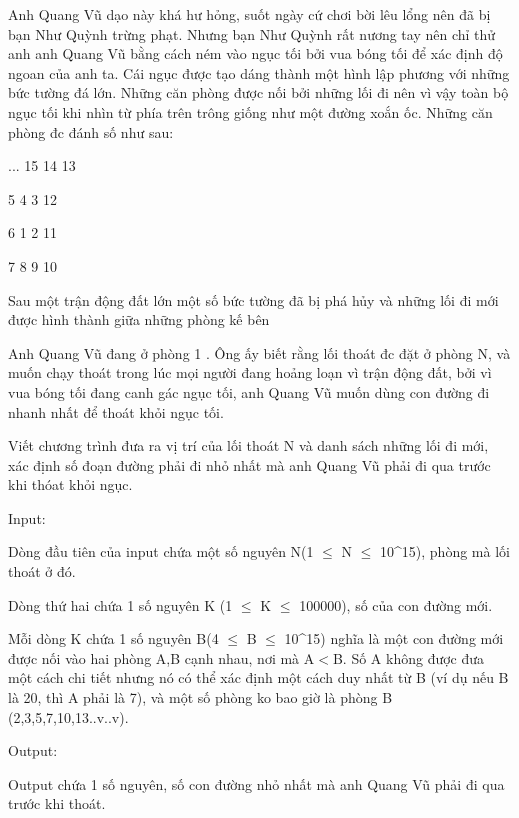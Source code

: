 



   Anh Quang Vũ dạo này khá hư hỏng, suốt ngày cứ chơi bời lêu lổng nên đã bị bạn Như Quỳnh trừng phạt. Nhưng bạn Như Quỳnh rất nương tay nên chỉ thử anh anh Quang Vũ bằng cách ném vào ngục tối bởi vua bóng tối để xác định độ ngoan của anh ta. Cái ngục được tạo dáng thành một hình lập phương với những bức tường đá lớn. Những căn phòng được nối bởi những lối đi nên vì vậy toàn bộ ngục tối khi nhìn từ phía trên trông giống như một đường xoắn ốc. Những căn phòng đc đánh số như sau:  



   ... 15  14  13  

   5   4    3  12  

   6   1    2  11  

   7   8    9  10  





   Sau một trận động đất lớn một số bức tường đã bị phá hủy và những lối đi mới được hình thành giữa những phòng kế bên  

   Anh Quang Vũ đang ở phòng 1 . Ông ấy biết rằng lối thoát đc đặt ở phòng N, và muốn chạy thoát trong lúc mọi người đang hoảng loạn vì trận động đất, bởi vì vua bóng tối đang canh gác ngục tối, anh Quang Vũ muốn dùng con đường đi nhanh nhất để thoát khỏi ngục tối.  

   Viết chương trình đưa ra vị trí của lối thoát N và danh sách những lối đi mới, xác định số đoạn đường phải đi nhỏ nhất mà anh Quang Vũ phải đi qua trước khi thóat khỏi ngục.  

            Input:         



   Dòng đầu tiên của input chứa một số nguyên N(1 $\le$ N $\le$ 10^15), phòng mà lối thoát ở đó.  

   Dòng thứ hai chứa 1 số nguyên K (1 $\le$ K $\le$ 100000), số của con đường mới.  

   Mỗi dòng K chứa 1 số nguyên B(4 $\le$ B $\le$ 10^15) nghĩa là một con đường mới được nối vào hai phòng A,B cạnh nhau, nơi mà A$<$B. Số A không được đưa một cách chi tiết nhưng nó có thể xác định một cách duy nhất từ B (ví dụ nếu B là 20, thì A phải là 7), và một số phòng ko bao giờ là phòng B (2,3,5,7,10,13..v..v).  

            Output:         



   Output chứa 1 số nguyên, số con đường nhỏ nhất mà anh Quang Vũ phải đi qua trước khi thoát.  

